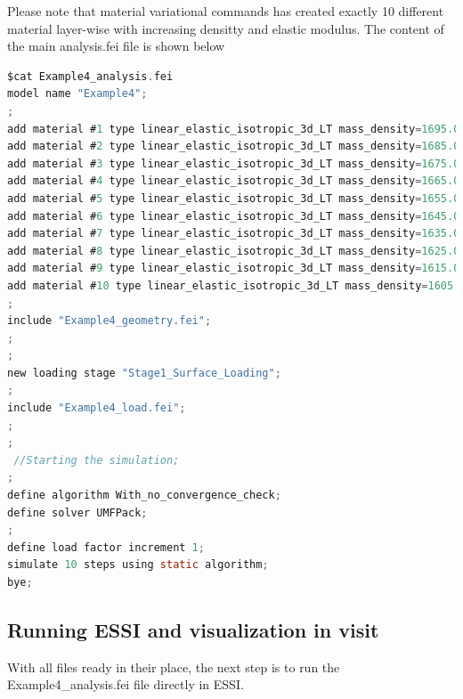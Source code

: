 \documentclass[11pt]{article}
\begin{document}
Please note that
material variational commands has created exactly 10 different material
layer-wise with increasing densitty and elastic modulus. The content of the
main analysis.fei file is shown below

\begin{lstlisting}[language=C]
$cat Example4_analysis.fei
model name "Example4";
; 
add material #1 type linear_elastic_isotropic_3d_LT mass_density=1695.000000*kg/m^3 elastic_modulus=2420000000.000000*Pa poisson_ratio=0.35;  
add material #2 type linear_elastic_isotropic_3d_LT mass_density=1685.000000*kg/m^3 elastic_modulus=2280000000.000000*Pa poisson_ratio=0.35;  
add material #3 type linear_elastic_isotropic_3d_LT mass_density=1675.000000*kg/m^3 elastic_modulus=2120000000.000000*Pa poisson_ratio=0.35;  
add material #4 type linear_elastic_isotropic_3d_LT mass_density=1665.000000*kg/m^3 elastic_modulus=1980000000.000000*Pa poisson_ratio=0.35;  
add material #5 type linear_elastic_isotropic_3d_LT mass_density=1655.000000*kg/m^3 elastic_modulus=1820000000.000000*Pa poisson_ratio=0.35;  
add material #6 type linear_elastic_isotropic_3d_LT mass_density=1645.000000*kg/m^3 elastic_modulus=1680000000.000000*Pa poisson_ratio=0.35;  
add material #7 type linear_elastic_isotropic_3d_LT mass_density=1635.000000*kg/m^3 elastic_modulus=1520000000.000000*Pa poisson_ratio=0.35;  
add material #8 type linear_elastic_isotropic_3d_LT mass_density=1625.000000*kg/m^3 elastic_modulus=1380000000.000000*Pa poisson_ratio=0.35;  
add material #9 type linear_elastic_isotropic_3d_LT mass_density=1615.000000*kg/m^3 elastic_modulus=1220000000.000000*Pa poisson_ratio=0.35;  
add material #10 type linear_elastic_isotropic_3d_LT mass_density=1605.000000*kg/m^3 elastic_modulus=1080000000.000000*Pa poisson_ratio=0.35; 
; 
include "Example4_geometry.fei";
; 
; 
new loading stage "Stage1_Surface_Loading";
; 
include "Example4_load.fei";
; 
; 
 //Starting the simulation;
; 
define algorithm With_no_convergence_check;
define solver UMFPack;
; 
define load factor increment 1;
simulate 10 steps using static algorithm;
bye; 	
\end{lstlisting}

\subsection{Running ESSI and visualization in visit}

With all files ready in their place, the next step is to run the
Example4_analysis.fei file directly in ESSI. 
\end{document}
